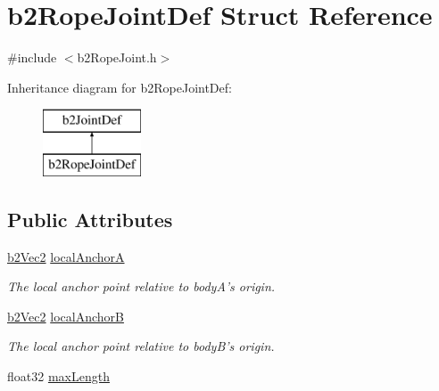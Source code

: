 \hypertarget{structb2_rope_joint_def}{\section{b2\-Rope\-Joint\-Def Struct Reference}
\label{structb2_rope_joint_def}
}


{\ttfamily \#include $<$b2\-Rope\-Joint.\-h$>$}

Inheritance diagram for b2\-Rope\-Joint\-Def\-:\begin{figure}[H]
\begin{center}
\leavevmode
\includegraphics[height=2.000000cm]{structb2_rope_joint_def}
\end{center}
\end{figure}
\subsection*{Public Attributes}
\begin{DoxyCompactItemize}
\item 
\hypertarget{structb2_rope_joint_def_ab680fcc3cd44741a7a824ddff86ff01e}{\hyperlink{structb2_vec2}{b2\-Vec2} \hyperlink{structb2_rope_joint_def_ab680fcc3cd44741a7a824ddff86ff01e}{local\-Anchor\-A}}\label{structb2_rope_joint_def_ab680fcc3cd44741a7a824ddff86ff01e}

\begin{DoxyCompactList}\small\item\em The local anchor point relative to body\-A's origin. \end{DoxyCompactList}\item 
\hypertarget{structb2_rope_joint_def_a3271da0e4027e25546aa6a81e8fbe4e2}{\hyperlink{structb2_vec2}{b2\-Vec2} \hyperlink{structb2_rope_joint_def_a3271da0e4027e25546aa6a81e8fbe4e2}{local\-Anchor\-B}}\label{structb2_rope_joint_def_a3271da0e4027e25546aa6a81e8fbe4e2}

\begin{DoxyCompactList}\small\item\em The local anchor point relative to body\-B's origin. \end{DoxyCompactList}\item 
float32 \hyperlink{structb2_rope_joint_def_a6efdcae22e2bdcfc3aae62da1a5f0d69}{max\-Length}
\end{DoxyCompactItemize}


